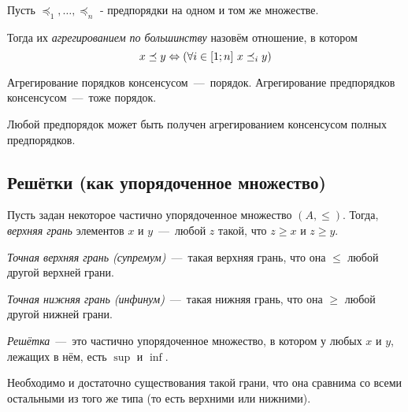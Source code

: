 \begin{definition}
	Пусть $\preceq_1, \ldots, \preceq_n$ - предпорядки на одном и том же множестве.
	
	Тогда их \textit{агрегированием по большинству} назовём отношение, в котором
	\[
		x \preceq y \Leftrightarrow (\forall i \in [1; n]\ x \preceq_i y)
	\]
\end{definition}

\begin{theorem}
	Агрегирование порядков консенсусом~---~порядок. 
	Агрегирование предпорядков консенсусом~---~тоже порядок.
\end{theorem}

\begin{theorem}
	Любой предпорядок может быть получен агрегированием консенсусом полных предпорядков.
\end{theorem}

\subsection{Решётки (как упорядоченное множество)}

\begin{definition}
	Пусть задан некоторое частично упорядоченное множество $(A, \le)$. Тогда, \textit{верхняя грань} элементов $x$ и $y$~---~любой $z$ такой, что $z \ge x$ и $z \ge y$.
\end{definition}

\begin{definition}
	\textit{Точная верхняя грань (супремум)}~---~такая верхняя грань, что она $\le$ любой другой верхней грани. 
\end{definition}

\begin{definition}
	\textit{Точная нижняя грань (инфинум)}~---~такая нижняя грань, что она $\ge$ любой другой нижней грани.
\end{definition}

\begin{definition}
	\textit{Решётка}~---~это частично упорядоченное множество, в котором у любых $x$ и $y$, лежащих в нём, есть $\sup$ и $\inf$.
\end{definition}

\begin{note}
	Необходимо и достаточно существования такой грани, что она сравнима со всеми остальными из того же типа (то есть верхними или нижними).
\end{note}